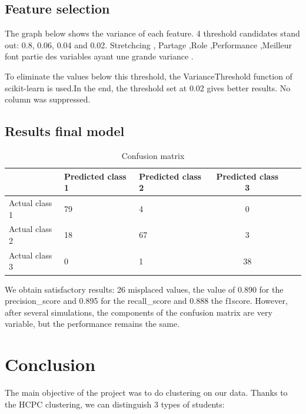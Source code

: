 \documentclass[12pt]{article}
\begin{document}
\vspace{0.2 cm}



  
\subsection{Feature selection} 


\noindent The graph below shows the variance of each feature. 
 4 threshold candidates stand out: 0.8, 0.06, 0.04 and 0.02.
Stretchcing , Partage ,Role ,Performance ,Meilleur font partie des variables ayant une grande variance .



\noindent To eliminate the values below this threshold, the VarianceThreshold function of scikit-learn is used.In the end, the threshold set at 0.02 gives better results. No column was suppressed. 

\subsection{Results final model} 



\begin{center}
    
\begin{table}[H]
    \begin{tabular}{|l|l|l|c|c|c|}
        \hline
         & Predicted class 1 & Predicted class 2 & Predicted class 3  \tabularnewline
        \hline
        Actual class 1 & 79 & 4 & 0 \tabularnewline
        \hline 
        Actual class 2 & 18 & 67  & 3  \tabularnewline
        \hline
         Actual class 3 & 0 & 1 & 38 \tabularnewline
        \hline
    \end{tabular}
    \caption{Confusion matrix}
    \label{tab:my_label}
\end{table}

\end{center}



\noindent We obtain satisfactory results: 
26 misplaced values, the value of 0.890 for the precision\_score and 0.895 for the recall\_score and 0.888 the f1\-score. However, after several simulations, the components of the confusion matrix are very variable, but the performance remains the same.  

\section{Conclusion}
The main objective of the project was to do clustering on our data.
Thanks to the HCPC clustering, we can distinguish 3 types of students:
\end{document}
